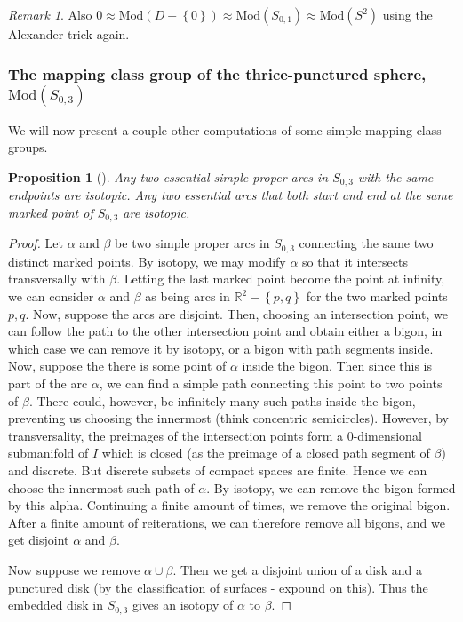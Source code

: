\documentclass[reqno]{amsart}
\newtheorem{proposition}[theorem]{Proposition}
\theoremstyle{definition}
\theoremstyle{remark}
\newtheorem*{remark}{Remark}
\newcommand{\Mod}{{\mathrm{Mod}}}
\begin{document}
\begin{remark}
    Also $0 \approx \Mod\left( D - \left\{ 0 \right\}  \right) 
    \approx \Mod \left( S_{0,1} \right) \approx
    \Mod\left( S^2 \right) $ using the Alexander trick again.
\end{remark}

\subsubsection{The mapping class group of the thrice-punctured sphere,
$\Mod \left( S_{0,3} \right) $}


We will now present a couple other computations of
some simple mapping class groups.

\begin{proposition}[]\label{prop2.2}
    Any two essential simple proper arcs in $S_{0,3}$ with the
    same endpoints are isotopic. Any two essential arcs that both
    start and end at the same marked point of $S_{0,3}$ are isotopic.
\end{proposition}

\begin{proof}
    Let $\alpha$ and $\beta$ be two simple proper arcs in
    $S_{0,3}$ connecting the same two distinct marked points.
    By isotopy, we may modify $\alpha$ so that
    it intersects transversally with $\beta$.
    Letting the last marked point become the point at infinity,
    we can consider $\alpha$ and $\beta$ as being
    arcs in $\mathbb{R}^2 - \left\{ p,q \right\} $ for
    the two marked points $p,q$.
    Now, suppose the arcs are disjoint.
    Then, choosing an intersection point, we can follow
    the path to the other intersection point and obtain
    either a bigon, in which case we can remove it by isotopy,
    or a bigon with path segments inside.
    Now, suppose
    the there is some point of $\alpha$ inside the bigon.
    Then since this is part of the arc $\alpha$, we can find
    a simple path connecting this point to two points
    of $\beta$. There could, however, be infinitely many
    such paths inside the bigon, preventing us choosing the
    innermost (think concentric semicircles).
    However, by transversality, the preimages of the 
    intersection points
    form a $0$-dimensional submanifold of $I$ which is closed
    (as the preimage of a closed path segment of $ \beta$)
    and discrete.
    But discrete subsets of compact spaces are finite. Hence
    we can choose the innermost such path of $ \alpha$.
    By isotopy, we can remove the bigon formed by  this alpha.
    Continuing a finite amount of times, we remove the original
    bigon. After a finite amount of reiterations, we can
    therefore remove all bigons, and we get
    disjoint $ \alpha$ and $\beta$.

    Now suppose we remove $\alpha \cup  \beta$. Then
    we get a disjoint union of a disk and a punctured
    disk (by the classification of surfaces - expound on this).
    \todo{}
    Thus the embedded disk in $S_{0,3}$ gives an isotopy
    of $\alpha$ to $\beta$.
\end{proof}
 
\end{document}
